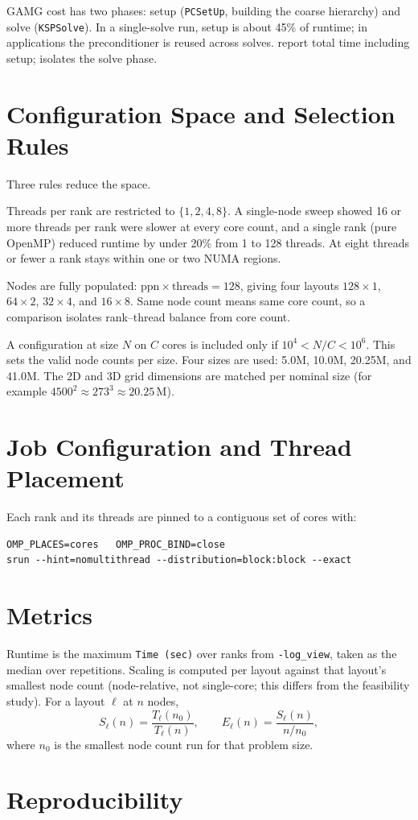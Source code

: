 GAMG cost has two phases: setup (\texttt{PCSetUp}, building the coarse hierarchy) and
solve (\texttt{KSPSolve}). In a single-solve run, setup is about 45\% of runtime; in
applications the preconditioner is reused across solves. 
report total time including setup;  isolates the solve phase.

\section{Configuration Space and Selection Rules}
\label{sec:configspace}
Three rules reduce the space.

Threads per rank are restricted to $\{1,2,4,8\}$. A single-node sweep showed 16 or more
threads per rank were slower at every core count, and a single rank (pure OpenMP) reduced
runtime by under 20\% from 1 to 128 threads. At eight threads or fewer a rank stays within
one or two NUMA regions.

Nodes are fully populated: $\text{ppn} \times \text{threads} = 128$, giving four layouts
$128\times1$, $64\times2$, $32\times4$, and $16\times8$. Same node count means same core
count, so a comparison isolates rank--thread balance from core count.

A configuration at size $N$ on $C$ cores is included only if $10^4 < N/C < 10^6$. This
sets the valid node counts per size. Four sizes are used: 5.0M, 10.0M, 20.25M, and 41.0M.
The 2D and 3D grid dimensions are matched per nominal size (for example
$4500^2 \approx 273^3 \approx 20.25\,\text{M}$).

\section{Job Configuration and Thread Placement}
\label{sec:placement}
Each rank and its threads are pinned to a contiguous set of cores with:
\begin{verbatim}
OMP_PLACES=cores   OMP_PROC_BIND=close
srun --hint=nomultithread --distribution=block:block --exact
\end{verbatim}

\section{Metrics}
\label{sec:metrics}
Runtime is the maximum \texttt{Time (sec)} over ranks from \texttt{-log\_view}, taken as
the median over repetitions. Scaling is computed per layout against that layout's smallest
node count (node-relative, not single-core; this differs from the feasibility study). For
a layout $\ell$ at $n$ nodes,
\[
  S_\ell(n) = \frac{T_\ell(n_0)}{T_\ell(n)}, \qquad
  E_\ell(n) = \frac{S_\ell(n)}{n/n_0},
\]
where $n_0$ is the smallest node count run for that problem size.

\section{Reproducibility}
\label{sec:repro}

